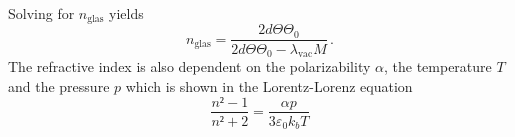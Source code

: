  Solving for $n_{\text{glas}}$ yields 
 \begin{equation}
    n_{\text{glas}} = \frac{2d \Theta \Theta_0}{2d \Theta \Theta_0 - \lambda_{\text{vac}}M} \label{eqn:n_glass_umgestellt}\, .
 \end{equation}
 The refractive index is also dependent on the polarizability $\alpha$, the temperature $T$ and the pressure $p$ which is shown in the 
 Lorentz-Lorenz equation 
 \begin{equation}
   \frac{n²-1}{n²+2} = \frac{\alpha p}{3 \varepsilon_0 k_b T} 
   \label{eqn:Lorentz_Lorenz}
 \end{equation}